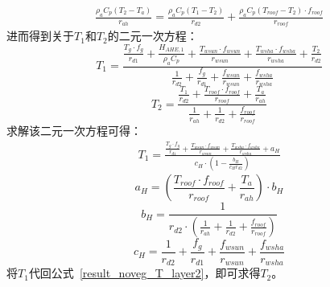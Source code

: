 %
\begin{equation}
    \begin{split}
        \frac{\rho _a C_p \left( T_{2} - T_a \right)}{r_{ah}} = 
        \frac{\rho _a C_p \left( T_{1} - T_{2} \right)}{r_{d2}} + \frac{\rho _a C_p \left( T_{roof} - T_{2} \right)\cdot f_{roof}}{r_{roof}}
    \end{split}
\end{equation}
进而得到关于$T_{1}$和$T_{2}$的二元一次方程：
\begin{equation}
         T_{1} =
         \frac{\frac{T_{g} \cdot f_{g}}{r_{d1}} + \frac{H_{AHE,1}}{\rho _a C_p} + \frac{T_{wsun} \cdot f_{wsun}}{r_{wsun}} + \frac{T_{wsha} \cdot f_{wsha}}{r_{wsha}} + \frac{T_{2}}{r_{d2}}}{\frac{1}{r_{d2}} + \frac{f_{g}}{r_{d1}} + \frac{f_{wsun}}{r_{wsun}} + \frac{f_{wsha}}{r_{wsha}}}
\end{equation}
%
\begin{equation}\label{result_noveg_T_layer2}
    T_{2} = \frac{\frac{T_{1}}{r_{d2}} + \frac{T_{roof} \cdot f_{roof}}{r_{roof}} + \frac{T_a}{r_{ah}}}{\frac{1}{r_{ah}} + \frac{1}{r_{d2}} + \frac{f_{roof}}{r_{roof}}}
\end{equation}
求解该二元一次方程可得：
\begin{equation}
    \begin{split}
         T_{1} = 
         \frac{\frac{T_{g} \cdot f_{g}}{r_{d1}} + \frac{T_{wsun} \cdot f_{wsun}}{r_{wsun}} + \frac{T_{wsha} \cdot f_{wsha}}{r_{wsha}} + a_{H}}{c_{H} \cdot \left( 1 - \frac{b_H}{c_{H} r_{d2}} \right)}
    \end{split}
\end{equation}
%
\begin{equation}
    a_{H} = \left(\frac{T_{roof} \cdot f_{roof}}{r_{roof}} + \frac{T_a}{r_{ah}}\right) \cdot b_{H}
\end{equation}
%
\begin{equation}
    b_{H} = \frac{1}{r_{d2} \cdot \left(\frac{1}{r_{ah}} + \frac{1}{r_{d2}} + \frac{f_{roof}}{r_{roof}} \right)}
\end{equation}
%
\begin{equation}
    c_{H} = \frac{1}{r_{d2}} + \frac{f_{g}}{r_{d1}} + \frac{f_{wsun}}{r_{wsun}} + \frac{f_{wsha}}{r_{wsha}}
\end{equation}
将$T_{1}$代回公式~\eqref{result_noveg_T_layer2}，即可求得$T_{2}$。

